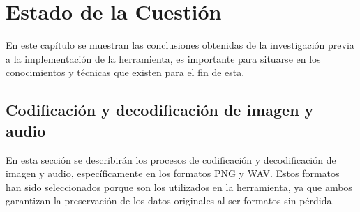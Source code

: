 \chapter{Estado de la Cuestión}
\label{cap:estadoDeLaCuestion}





En este capítulo se muestran las conclusiones obtenidas de la investigación previa a la implementación de la herramienta, es importante para situarse en los conocimientos y técnicas que existen para el fin de esta.

\section{Codificación y decodificación de imagen y audio}
En esta sección se describirán los procesos de codificación y decodificación de imagen y audio, específicamente en los formatos PNG y WAV. Estos formatos han sido seleccionados porque son los utilizados en la herramienta, ya que ambos garantizan la preservación de los datos originales al ser formatos sin pérdida.

